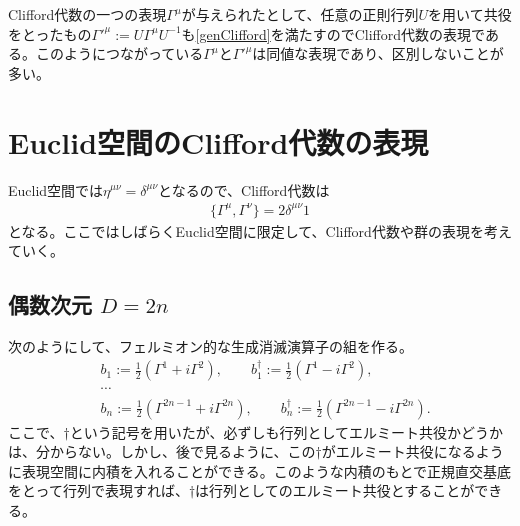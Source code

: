 \documentclass[12pt,a4paper,dvipdfmx]{jlreq}
\begin{document}
Clifford代数の一つの表現$\Gamma^{\mu}$が与えられたとして、任意の正則行列$U$を用いて共役をとったもの$\Gamma'^{\mu}:=U\Gamma^{\mu}U^{-1}$も\eqref{genClifford}を満たすのでClifford代数の表現である。このようにつながっている$\Gamma^{\mu}$と$\Gamma'^{\mu}$は同値な表現であり、区別しないことが多い。

\section{Euclid空間のClifford代数の表現}
Euclid空間では$\eta^{\mu\nu}=\delta^{\mu\nu}$となるので、Clifford代数は
\begin{align}
  \{\Gamma^{\mu},\Gamma^{\nu}\}=2\delta^{\mu\nu} 1
  \label{Clifford}
\end{align}
となる。ここではしばらくEuclid空間に限定して、Clifford代数や群の表現を考えていく。

\subsection{偶数次元 $D=2n$}
次のようにして、フェルミオン的な生成消滅演算子の組を作る。
\begin{equation}
\begin{aligned}
  &b_1:=\frac12 (\Gamma^1+i\Gamma^2),\qquad
  b_1^{\dag}:=\frac12 (\Gamma^1-i\Gamma^2),\\
  &\cdots\\
  &b_n:=\frac12(\Gamma^{2n-1}+i\Gamma^{2n}),\qquad
  b_n^{\dag}:=\frac12(\Gamma^{2n-1}-i\Gamma^{2n}).
\end{aligned}  
\label{creani}
\end{equation}
ここで、$\dag$という記号を用いたが、必ずしも行列としてエルミート共役かどうかは、分からない。しかし、後で見るように、この$\dag$がエルミート共役になるように表現空間に内積を入れることができる。このような内積のもとで正規直交基底をとって行列で表現すれば、$\dag$は行列としてのエルミート共役とすることができる。
\end{document}
